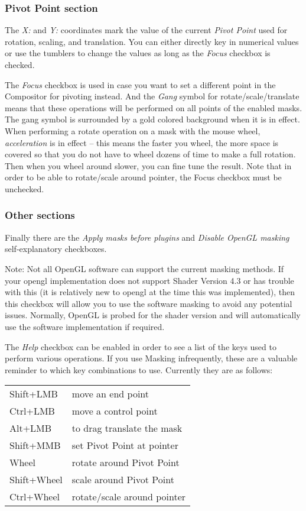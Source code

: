 \subsubsection*{Pivot Point section}%
\label{ssub:pivot_point_section}

The \textit{X:} and \textit{Y:} coordinates mark the value of the current \textit{Pivot Point} used for rotation, scaling, and translation.  You can either directly key in numerical values or use the tumblers to change the values as long as the \textit{Focus} checkbox is checked.

The \textit{Focus} checkbox is used in case you want to set a different point in the Compositor for pivoting instead.  And the \textit{Gang} symbol for rotate/scale/translate means that these operations will be performed on all points of the enabled masks.  The gang symbol is surrounded by a gold colored background when it is in effect.  When performing a rotate operation on a mask with the mouse wheel, \textit{acceleration} is in effect -- this means the faster you wheel, the more space is covered so that you do not have to wheel dozens of time to make a full rotation.  Then when you wheel around slower, you can fine tune the result.
Note that in order to be able to rotate/scale around pointer, the Focus checkbox must be unchecked.

\subsubsection*{Other sections}%
\label{ssub:other_sections}

Finally there are the \textit{Apply masks before plugins} and \textit{Disable OpenGL masking} self-explanatory checkboxes.

Note: Not all OpenGL software can support the current masking methods.  If your opengl implementation does not support Shader Version 4.3 or has trouble with this (it is relatively new to opengl at the time this was implemented), then this checkbox will allow you to use the software masking to avoid any potential issues.  Normally, OpenGL is probed for the shader version and will automatically use the software implementation if required.

The \textit{Help} checkbox can be enabled in order to see a list of the keys used to perform various operations.  If you use Masking infrequently, these are a valuable reminder to which key combinations to use.  Currently they are as follows:

\vspace{2ex}
\begin{tabular}{ l  l }
    \hline			
    Shift+LMB & move an end point \\
    Ctrl+LMB & move a control point \\
    Alt+LMB & to drag translate the mask \\
    Shift+MMB & set Pivot Point at pointer \\
    Wheel & rotate around Pivot Point \\
    Shift+Wheel & scale around Pivot Point \\
    Ctrl+Wheel & rotate/scale around pointer \\
    \hline  
\end{tabular}

